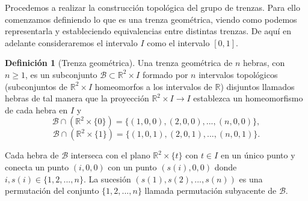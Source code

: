 \documentclass[12pt]{article}
\theoremstyle{definition}
\newtheorem{defi}{Definición}[section]
\begin{document}

Procedemos a realizar la construcción topológica del grupo de trenzas. Para ello comenzamos definiendo lo que es una trenza geométrica, viendo como podemos representarla y estableciendo equivalencias entre distintas trenzas. De aquí en adelante consideraremos el intervalo $I$ como el intervalo $[0,1]$.


\begin{defi}[Trenza geométrica]\label{trenza_geom}
Una trenza geométrica de $n$ hebras, con $n \geq 1$, es un subconjunto $\mathcal{B}\subset\mathbb{R}^2\times I$ formado por $n$ intervalos topológicos (subconjuntos de $\mathbb{R}^2\times I$ homeomorfos a los intervalos de $\mathbb{R}$) disjuntos llamados hebras de tal manera que la proyección $\mathbb{R}^2\times I\rightarrow I$ establezca un homeomorfismo de cada hebra en $I$ y
$$\mathcal{B}\cap(\mathbb{R}^2\times \{0\})=\{(1,0,0),(2,0,0),...,(n,0,0)\},$$
$$\mathcal{B}\cap(\mathbb{R}^2\times \{1\})=\{(1,0,1),(2,0,1),...,(n,0,1)\}.$$

Cada hebra de $\mathcal{B}$ interseca con el plano $\mathbb{R}^2\times \{t\}$ con $t\in I$ en un único punto y conecta un punto $(i,0,0)$ con un punto $(s(i),0,0)$ donde $i,s(i)\in\{1,2,...,n\}$. La sucesión $(s(1),s(2),...,s(n))$ es una permutación del conjunto $\{1,2,...,n\}$ llamada permutación subyacente de $\mathcal{B}$.
\end{defi}
\end{document}
